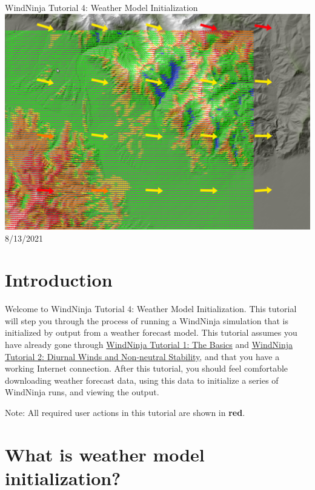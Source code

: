 \documentclass[12pt]{article}
\begin{document}
\begin{titlepage}
    \centering
    {\Huge
       WindNinja Tutorial 4: Weather Model Initialization
    }    
    \vfill
    \includegraphics[scale=0.35]							{title_fig}
    \vfill
  	{\Huge
	  8/13/2021 %
  	}
    \vfill
\end{titlepage}

\section*{Introduction}

Welcome to WindNinja Tutorial 4: Weather Model Initialization.  This tutorial will step you through the process of running a WindNinja simulation that is initialized by output from a weather forecast model.  This tutorial assumes you have already gone through \href{https://weather.firelab.org/windninja/tutorials/WindNinja_tutorial1.pdf}{WindNinja Tutorial 1: The Basics} and \href{https://weather.firelab.org/windninja/tutorials/WindNinja_tutorial2.pdf}{WindNinja Tutorial 2: Diurnal Winds and Non-neutral Stability}, and that you have a working Internet connection.  After this tutorial, you should feel comfortable downloading weather forecast data, using this data to initialize a series of WindNinja runs, and viewing the output.
    
Note:  All required user actions in this tutorial are shown in \textbf{\color{red}red}.

\section*{What is weather model initialization?}
\end{document}
